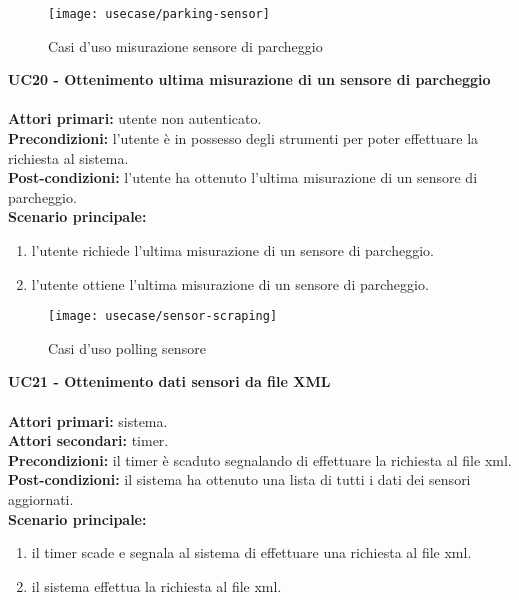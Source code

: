 \leavevmode\newline
\begin{figure}[H]
    \centering
    \texttt{[image: usecase/parking-sensor]}
    \caption{Casi d'uso misurazione sensore di parcheggio}
\end{figure}
\textbf{UC20 - Ottenimento ultima misurazione di un sensore di parcheggio}
\\\\
\textbf{Attori primari:} utente non autenticato.
\\
\textbf{Precondizioni:} l'utente è in possesso degli strumenti per poter effettuare la richiesta al sistema.
\\
\textbf{Post-condizioni:} l'utente ha ottenuto l'ultima misurazione di un sensore di parcheggio.
\\
\textbf{Scenario principale:}
\begin{enumerate}
    \item l'utente richiede l'ultima misurazione di un sensore di parcheggio.
    \item l'utente ottiene l'ultima misurazione di un sensore di parcheggio.
\end{enumerate}

\leavevmode\newline
\begin{figure}[H]
    \centering
    \texttt{[image: usecase/sensor-scraping]}
    \caption{Casi d'uso polling sensore}
\end{figure}
\textbf{UC21 - Ottenimento dati sensori da file XML}
\\\\
\textbf{Attori primari:} sistema.
\\
\textbf{Attori secondari:} timer.
\\
\textbf{Precondizioni:} il timer è scaduto segnalando di effettuare la richiesta al file \gls{xml}.
\\
\textbf{Post-condizioni:} il sistema ha ottenuto una lista di tutti i dati dei sensori aggiornati.
\\
\textbf{Scenario principale:}
\begin{enumerate}
    \item il timer scade e segnala al sistema di effettuare una richiesta al file \gls{xml}.
    \item il sistema effettua la richiesta al file \gls{xml}.
\end{enumerate}

